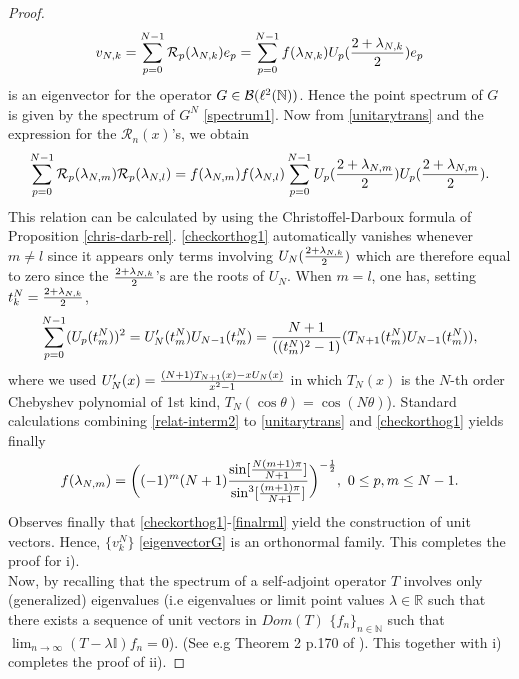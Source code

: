 \documentclass[a4paper]{jpconf}
\numberwithin{equation}{section}
\newcommand\bbone{{ \mathbb{I}}}
\theoremstyle{nonumberplain}
\newtheorem{proof}{Proof}
\begin{document}
\begin{proof}
\begin{equation}
v_{N,k}=\sum_{p=0}^{N-1}{\cal{R}}_{p}(\lambda_{N,k})e_p=\sum_{p=0}^{N-1}f(\lambda_{N,k})U_p({{2+\lambda_{N,k}}\over{2}})e_p\label{eigenvectorG}
\end{equation}
is an eigenvector for the operator $G\in{\cal{B}}(\ell^2(\mathbb{N}))$. Hence the point spectrum of $G$ is given by the spectrum of $G^N$ \eqref{spectrum1}. Now from \eqref{unitarytrans} and the expression for the $\mathcal{R}_n(x)$'s, we obtain 
\begin{equation}
\sum_{p=0}^{N-1}{\cal{R}}_p(\lambda_{N,m}){\cal{R}}_p(\lambda_{N,l})=f(\lambda_{N,m})f(\lambda_{N,l})\sum_{p=0}^{N-1}
U_p(\frac{2+\lambda_{N,m}}{2})U_p(\frac{2+\lambda_{N,m}}{2})\label{checkorthog1}.
\end{equation}
This relation can be calculated by using the Christoffel-Darboux formula of Proposition \ref{chris-darb-rel}. \eqref{checkorthog1} automatically vanishes whenever $m\ne l$ since it appears only terms involving $U_N({{2+\lambda_{N,k}}\over{2}})$ which are therefore equal to zero since the ${{2+\lambda_{N,k}}\over{2}}$'s are the roots of $U_N$. When $m=l$, one has, setting $t^N_k={{2+\lambda_{N,k}}\over{2}}$,
\begin{equation}
\sum_{p=0}^{N-1}(U_p(t^N_m))^2=U_N^\prime(t^N_m)U_{N-1}(t^N_m)={{N+1}\over{((t^N_m)^2-1)}}(T_{N+1}(t^N_m)U_{N-1}(t^N_m))\label{relat-interm2},
\end{equation}
where we used $U^\prime_N(x)={{(N+1)T_{N+1}(x)-xU_N(x) }\over{x^2-1 }}$ in which $T_N(x)$ is the $N$-th order Chebyshev polynomial of 1st kind, $T_N(\cos\theta)=\cos(N\theta)$). Standard calculations combining \eqref{relat-interm2} to \eqref{unitarytrans} and \eqref{checkorthog1} yields finally
\begin{equation}
f(\lambda_{N,m})=\bigg((-1)^m(N+1){{ \sin[{{N(m+1)\pi }\over{N+1 }}  ]}\over {\sin^3[{{(m+1)\pi }\over{N+1 }} ] }} \bigg)^{-{{1}\over{2}}},\ 0\le p,m\le N-1\label{finalrml}.
\end{equation}
Observes finally that \eqref{checkorthog1}-\eqref{finalrml} yield the construction of unit vectors. Hence, $\{v^N_k\}$ \eqref{eigenvectorG} is an orthonormal family. This completes the proof for i). \\
Now, by recalling that the spectrum of a self-adjoint operator $T$ involves only (generalized) eigenvalues (i.e eigenvalues or limit point values $\lambda\in\mathbb{R}$ such that there exists a sequence of unit vectors in $Dom(T)$ $\{f_n\}_{n\in\mathbb{N}}$ such that $\lim_{n\to\infty}(T-\lambda\bbone)f_n=0$). (See e.g Theorem 2 p.170 of \cite{helmberg}). This together with i) completes the proof of ii).
\end{proof}
\end{document}
